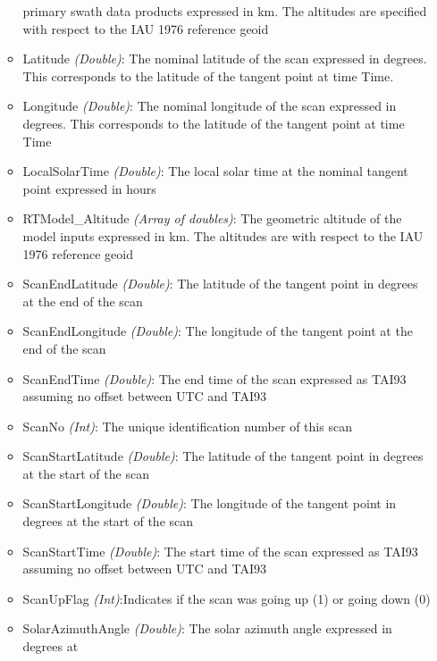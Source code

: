 \begin{itemize}
\begin{itemize}
                primary swath data products expressed in km. The altitudes are specified with
                respect to the IAU 1976 reference geoid
            \item Latitude              \emph{(Double)}: The nominal latitude of the scan expressed
                in degrees. This corresponds to the latitude of the tangent point at time Time.
            \item Longitude             \emph{(Double)}: The nominal longitude of the scan expressed
                in degrees. This corresponds to the latitude of the tangent point at time Time
            \item LocalSolarTime        \emph{(Double)}: The local solar time at the nominal tangent
                point expressed in hours
            \item RTModel\_Altitude      \emph{(Array of doubles)}: The geometric altitude of the model
                inputs expressed in km. The altitudes are with respect to the IAU 1976 reference geoid
            \item ScanEndLatitude       \emph{(Double)}: The latitude of the tangent point in degrees
                at the end of the scan
            \item ScanEndLongitude      \emph{(Double)}: The longitude of the tangent point at the end
                of the scan
            \item ScanEndTime           \emph{(Double)}: The end time of the scan expressed as TAI93
                assuming no offset between UTC and TAI93
            \item ScanNo                \emph{(Int)}: The unique identification number of this scan
            \item ScanStartLatitude     \emph{(Double)}: The latitude of the tangent point in degrees
                at the start of the scan
            \item ScanStartLongitude    \emph{(Double)}: The longitude of the tangent point in degrees
                at the start of the scan
            \item ScanStartTime         \emph{(Double)}: The start time of the scan expressed as TAI93
                assuming no offset between UTC and TAI93
            \item ScanUpFlag            \emph{(Int)}:Indicates if the scan was going up (1) or going down (0)
            \item SolarAzimuthAngle     \emph{(Double)}:  The solar azimuth angle expressed in degrees at

\end{itemize}
\end{itemize}
